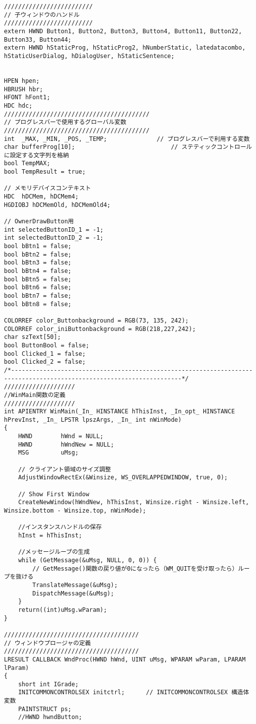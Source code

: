 \begin{verbatim}
/////////////////////////
// 子ウィンドウのハンドル
/////////////////////////
extern HWND Button1, Button2, Button3, Button4, Button11, Button22, Button33, Button44;
extern HWND hStaticProg, hStaticProg2, hNumberStatic, latedatacombo, hStaticUserDialog, hDialogUser, hStaticSentence;


HPEN hpen;
HBRUSH hbr;
HFONT hFont1;
HDC hdc;
/////////////////////////////////////////
// プログレスバーで使用するグローバル変数
/////////////////////////////////////////
int  _MAX, _MIN, _POS, _TEMP;              // プログレスバーで利用する変数
char bufferProg[10];                           // ステティックコントロールに設定する文字列を格納
bool TempMAX;
bool TempResult = true;

// メモリデバイスコンテキスト
HDC  hDCMem, hDCMem4;
HGDIOBJ hDCMemOld, hDCMemOld4;

// OwnerDrawButton用
int selectedButtonID_1 = -1;
int selectedButtonID_2 = -1;
bool bBtn1 = false;
bool bBtn2 = false;
bool bBtn3 = false;
bool bBtn4 = false;
bool bBtn5 = false;
bool bBtn6 = false;
bool bBtn7 = false;
bool bBtn8 = false;

COLORREF color_Buttonbackground = RGB(73, 135, 242);
COLORREF color_iniButtonbackground = RGB(218,227,242);
char szText[50];
bool ButtonBool = false;
bool Clicked_1 = false;
bool Clicked_2 = false;
/*----------------------------------------------------------------------------------------------------------------------*/
////////////////////
//WinMain関数の定義
////////////////////
int APIENTRY WinMain(_In_ HINSTANCE hThisInst, _In_opt_ HINSTANCE hPrevInst, _In_ LPSTR lpszArgs, _In_ int nWinMode)
{
	HWND		hWnd = NULL;
	HWND        hWndNew = NULL;
	MSG			uMsg;
	
	// クライアント領域のサイズ調整
	AdjustWindowRectEx(&Winsize, WS_OVERLAPPEDWINDOW, true, 0);

	// Show First Window
	CreateNewWindow(hWndNew, hThisInst, Winsize.right - Winsize.left, Winsize.bottom - Winsize.top, nWinMode);

	//インスタンスハンドルの保存
	hInst = hThisInst;

	//メッセージループの生成
	while (GetMessage(&uMsg, NULL, 0, 0)) {
		// GetMessage()関数の戻り値が0になったら（WM_QUITを受け取ったら）ループを抜ける
		TranslateMessage(&uMsg);
		DispatchMessage(&uMsg);
	}
	return((int)uMsg.wParam);
}

//////////////////////////////////////
// ウィンドウプロージャの定義
//////////////////////////////////////
LRESULT CALLBACK WndProc(HWND hWnd, UINT uMsg, WPARAM wParam, LPARAM lParam)
{
	short int IGrade;                       
	INITCOMMONCONTROLSEX initctrl;      // INITCOMMONCONTROLSEX 構造体変数
	PAINTSTRUCT ps;
	//HWND hwndButton;
	


\end{verbatim}
